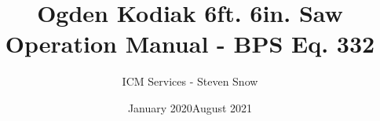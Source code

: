\documentclass[a4paper,12pt]{book}
\begin{document}
\author{ICM Services - Steven Snow}
\title{Ogden Kodiak 6ft. 6in. Saw Operation Manual - BPS Eq. 332}
\date{January 2020}
\date{August 2021}

\frontmatter
\maketitle
\tableofcontents
\listoffigures


\mainmatter










\backmatter
\printindex
\end{document}
